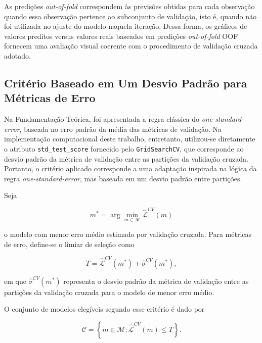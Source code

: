 As predições \textit{out-of-fold} correspondem às previsões obtidas para cada observação quando essa observação pertence ao subconjunto de validação, isto é, quando não foi utilizada no ajuste do modelo naquela iteração. Dessa forma, os gráficos de valores preditos versus valores reais baseados em predições \textit{out-of-fold} OOF fornecem uma avaliação visual coerente com o procedimento de validação cruzada adotado.

\subsection{Critério Baseado em Um Desvio Padrão para Métricas de Erro}

Na Fundamentação Teórica, foi apresentada a regra clássica do \textit{one-standard-error}, baseada no erro padrão da média das métricas de validação. Na implementação computacional deste trabalho, entretanto, utilizou-se diretamente o atributo \texttt{std\_test\_score} fornecido pelo \texttt{GridSearchCV}, que corresponde ao desvio padrão da métrica de validação entre as partições da validação cruzada. Portanto, o critério aplicado corresponde a uma adaptação inspirada na lógica da regra \textit{one-standard-error}, mas baseada em um desvio padrão entre partições.

Seja

\begin{equation}
m^{\ast}=\arg\min_{m\in\mathcal{M}}\widehat{\mathcal{L}}^{CV}(m)
\label{eq:modelo_melhor_erro_medio}
\end{equation}

\noindent o modelo com menor erro médio estimado por validação cruzada. Para métricas de erro, define-se o limiar de seleção como

\begin{equation}
T=
\widehat{\mathcal{L}}^{CV}(m^{\ast})
+
\widehat{\sigma}^{CV}(m^{\ast}),
\label{eq:limiar_um_desvio}
\end{equation}

\noindent em que \(\widehat{\sigma}^{CV}(m^{\ast})\) representa o desvio padrão da métrica de validação entre as partições da validação cruzada para o modelo de menor erro médio.

O conjunto de modelos elegíveis segundo esse critério é dado por

\begin{equation}
\mathcal{C}=
\left\{
m\in\mathcal{M}:
\widehat{\mathcal{L}}^{CV}(m)\le T
\right\}.
\label{eq:conjunto_candidatos_um_desvio}
\end{equation}

